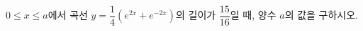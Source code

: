 \hspace*{2mm}\begin{minipage}[t]{\dimexpr\linewidth-2mm\relax}\vspace{0pt}
$0\le x\le a$에서 곡선 $y=\dfrac{1}{4}(e^{2x}+e^{-2x})$의 길이가 $\dfrac{15}{16}$일 때, 양수 $a$의 값을 구하시오.\end{minipage}
